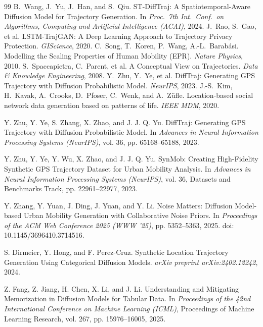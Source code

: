 \documentclass[sigconf,nonacm]{acmart}
\begin{document}
\begin{thebibliography}{99}
 B.~Wang, J.~Yu, J.~Han, and S.~Qiu. ST-DiffTraj: A Spatiotemporal-Aware Diffusion Model for Trajectory Generation. In \emph{Proc.\ 7th Int.\ Conf.\ on Algorithms, Computing and Artificial Intelligence (ACAI)}, 2024.
 J.~Rao, S.~Gao, et al. LSTM-TrajGAN: A Deep Learning Approach to Trajectory Privacy Protection. \emph{GIScience}, 2020.
 C.~Song, T.~Koren, P.~Wang, A.-L.~Barab\'asi. Modelling the Scaling Properties of Human Mobility (EPR). \emph{Nature Physics}, 2010.
 S.~Spaccapietra, C.~Parent, et al. A Conceptual View on Trajectories. \emph{Data \& Knowledge Engineering}, 2008.
 Y.~Zhu, Y.~Ye, et al. DiffTraj: Generating GPS Trajectory with Diffusion Probabilistic Model. \emph{NeurIPS}, 2023.
 J.-S.~Kim, H.~Kavak, A.~Crooks, D.~Pfoser, C.~Wenk, and A.~Z\"ufle. Location-based social network data generation based on patterns of life. \emph{IEEE MDM}, 2020.

Y. Zhu, Y. Ye, S. Zhang, X. Zhao, and J. J. Q. Yu.
DiffTraj: Generating GPS Trajectory with Diffusion Probabilistic Model.
In \emph{Advances in Neural Information Processing Systems (NeurIPS)},
vol. 36, pp. 65168--65188, 2023.

Y. Zhu, Y. Ye, Y. Wu, X. Zhao, and J. J. Q. Yu.
SynMob: Creating High-Fidelity Synthetic GPS Trajectory Dataset for
Urban Mobility Analysis.
In \emph{Advances in Neural Information Processing Systems (NeurIPS)},
vol. 36, Datasets and Benchmarks Track, pp. 22961--22977, 2023.

Y. Zhang, Y. Yuan, J. Ding, J. Yuan, and Y. Li.
Noise Matters: Diffusion Model-based Urban Mobility Generation with
Collaborative Noise Priors.
In \emph{Proceedings of the ACM Web Conference 2025 (WWW '25)},
pp. 5352--5363, 2025.
doi: 10.1145/3696410.3714516.

S. Dirmeier, Y. Hong, and F. Perez-Cruz.
Synthetic Location Trajectory Generation Using Categorical Diffusion Models.
\emph{arXiv preprint arXiv:2402.12242}, 2024.

Z. Fang, Z. Jiang, H. Chen, X. Li, and J. Li.
Understanding and Mitigating Memorization in Diffusion Models for
Tabular Data.
In \emph{Proceedings of the 42nd International Conference on Machine
Learning (ICML)}, Proceedings of Machine Learning Research,
vol. 267, pp. 15976--16005, 2025.

\end{thebibliography}
\end{document}
